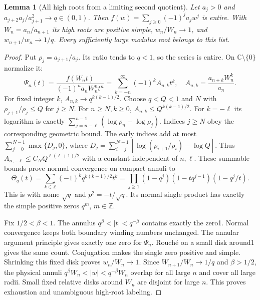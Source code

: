 \documentclass[11pt]{article}
\newtheorem{lemma}[theorem]{Lemma}
\theoremstyle{remark}\newtheorem{remark}[theorem]{Remark}
\newcommand{\C}{\mathbb C}
\newcommand{\Z}{\mathbb Z}
\begin{document}
\begin{lemma}[All high roots from a limiting second quotient]
\label{lem:euler-second-quotient}
Let $a_j>0$ and $a_{j+2}a_j/a_{j+1}^2\to q\in(0,1)$.
Then $f(w)=\sum_{j\ge0}(-1)^ja_jw^j$ is entire.
With $W_n=a_n/a_{n+1}$ its high roots are positive simple,
$w_n/W_n\to1$, and $w_{n+1}/w_n\to1/q$.
Every sufficiently large modulus root belongs to this list.
\end{lemma}
\begin{proof}
Put $\rho_j=a_{j+1}/a_j$. Its ratio tends to $q<1$,
so the series is entire. On $\C\setminus\{0\}$ normalize it:
\[
 \Psi_n(t)=\frac{f(W_nt)}{(-1)^na_nW_n^nt^n}
 =\sum_{k=-n}^\infty(-1)^k A_{n,k}t^k,\quad
             A_{n,k}=\frac{a_{n+k}W_n^k}{a_n}.           \tag{EUT6}
\]
For fixed integer $k$, $A_{n,k}\to q^{k(k-1)/2}$.
Choose $q<Q<1$ and $N$ with $\rho_{j+1}/\rho_j\le Q$
for $j\ge N$. For $n\ge N,k\ge0$,
$A_{n,k}\le Q^{k(k-1)/2}$.
For $k=-\ell$ its logarithm is exactly
$\sum_{j=n-\ell}^{n-1}(\log\rho_n-\log\rho_j)$.
Indices $j\ge N$ obey the corresponding geometric bound.
The early indices add at most
$\sum_{j=0}^{N-1}\max\{D_j,0\}$, where
$D_j=\sum_{i=j}^{N-1}
[\log(\rho_{i+1}/\rho_i)-\log Q]$.
Thus $A_{n,-\ell}\le C_NQ^{\ell(\ell+1)/2}$
with a constant independent of $n,\ell$.
These summable bounds prove normal convergence on compact annuli to
\[
 \Theta_q(t)=\sum_{k\in\Z}(-1)^kq^{k(k-1)/2}t^k
 =\prod_{j\ge1}(1-q^j)(1-tq^{j-1})(1-q^j/t).             \tag{EUT7}
\]
This is \cite[eq.~20.5.9]{DLMF} with nome $\sqrt q$
and $p^2=-t/\sqrt q$. Its normal single product has exactly
the simple positive zeros $q^m$, $m\in\Z$.

Fix $1/2<\beta<1$. The annulus
$q^\beta<|t|<q^{-\beta}$ contains exactly the zero1.
Normal convergence keeps both boundary winding numbers unchanged.
The annular argument principle gives exactly one zero for $\Psi_n$.
Rouch\'e on a small disk around1 gives the same count.
Conjugation makes the single zero positive and simple.
Shrinking this fixed disk proves $w_n/W_n\to1$.
Since $W_{n+1}/W_n\to1/q$ and $\beta>1/2$, the physical
annuli $q^\beta W_n<|w|<q^{-\beta}W_n$ overlap for all
large $n$ and cover all large radii.
Small fixed relative disks around $W_n$ are disjoint for large $n$.
This proves exhaustion and unambiguous high-root labeling.
\end{proof}
\end{document}
